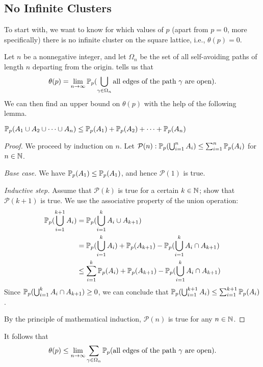\documentclass[a4paper, 12pt]{article}
\begin{document}
\subsection{No Infinite Clusters}\label{subsec:no_inf_cluster}
To start with, we want to know for which values of $p$ (apart from $p = 0$, more specifically) there is no infinite cluster on the square lattice, i.e., $\theta(p) = 0$.

Let $n$ be a nonnegative integer, and let $\Omega_n$ be the set of all self-avoiding paths of length $n$ departing from the origin.  tells us that
\[\theta(p) = \lim_{n \to \infty} \P(\bigcup_{\gamma \in \Omega_n} \text{all edges of the path } \gamma \text{ are open}).\]
We can then find an upper bound on $\theta(p)$ with the help of the following lemma.

\begin{lem}\label{lem:union_bound}
$\P(A_1 \cup A_2 \cup \cdots \cup A_n) \leq \P(A_1) + \P(A_2) + \cdots + \P(A_n)$
\end{lem}
\begin{proof}[Proof]
We proceed by induction on $n$. Let $\mathcal{P}(n): \P(\bigcup_{i = 1}^n A_i) \leq \sum_{i = 1}^n \P(A_i)$ for  $n \in \N$.
\begin{description}
\item \textit{Base case.} We have $\P(A_1) \leq \P(A_1)$, and hence $\mathcal{P}(1)$ is true.
\item \textit{Inductive step.} Assume that $\mathcal{P}(k)$ is true for a certain $k \in \N$; show that $\mathcal{P}(k + 1)$ is true.
We use the associative property of the union operation:
\begin{align*}
    \P(\bigcup_{i = 1}^{k + 1} A_i) 
    &= \P(\bigcup_{i = 1}^{k} A_i \cup A_{k + 1})\\
    &= \P(\bigcup_{i = 1}^{k} A_i) + \P(A_{k + 1}) - \P(\bigcup_{i = 1}^{k} A_i \cap A_{k + 1})\\
    &\leq \sum_{i = 1}^k \P(A_i) + \P(A_{k + 1}) - \P(\bigcup_{i = 1}^{k} A_i \cap A_{k + 1})\\
\end{align*}
Since $\P(\bigcup_{i = 1}^{k} A_i \cap A_{k + 1}) \geq 0$, we can conclude that $\P(\bigcup_{i = 1}^{k + 1} A_i) \leq \sum_{i = 1}^{k + 1} \P(A_i)$.
\end{description}
By the principle of mathematical induction, $\mathcal{P}(n)$ is true for any $n \in \N$.
\end{proof}

It follows that
\[\theta(p) \leq \lim_{n \to \infty} \sum_{\gamma \in \Omega_n} \P(\text{all edges of the path } \gamma \text{ are open}).\]
\end{document}
